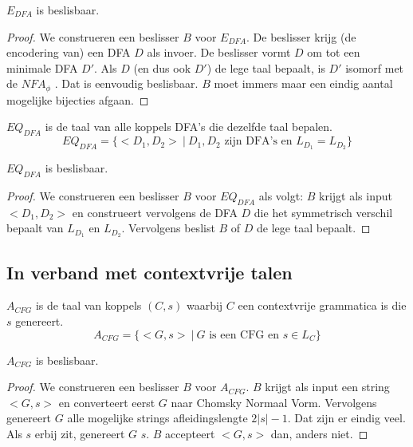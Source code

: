 \documentclass[main.tex]{subfiles}
\begin{document}
\begin{st}
  \label{st:e-dfa-besl}
  $E_{DFA}$ is beslisbaar.

  \begin{proof}
    We construeren een beslisser $B$ voor $E_{DFA}$.
    De beslisser krijg (de encodering van) een DFA $D$ als invoer.
    De beslisser vormt $D$ om tot een minimale DFA $D'$.
    Als $D$ (en dus ook $D'$) de lege taal bepaalt, is $D'$ isomorf met de $NFA_{\phi}$ .
    Dat is eenvoudig beslisbaar. $B$ moet immers maar een eindig aantal mogelijke bijecties afgaan.
  \end{proof}
\end{st}

\begin{de}
  \label{de:eq-dfa}
  $EQ_{DFA}$ is de taal van alle koppels DFA's die dezelfde taal bepalen.
  \[ EQ_{DFA} = \{ <D_{1},D_{2}> \ |\ D_{1},D_{2} \text{ zijn DFA's en } L_{D_{1}} = L_{D_{2}} \} \]  
\end{de}

\begin{st}
  \label{st:eq-dfa-besl}
  $EQ_{DFA}$ is beslisbaar.

  \begin{proof}
    We construeren een beslisser $B$ voor $EQ_{DFA}$ als volgt:
    $B$ krijgt als input $<D_{1},D_{2}>$ en construeert vervolgens de DFA $D$ die het symmetrisch verschil bepaalt van $L_{D_{1}}$ en $L_{D_{2}}$.
    Vervolgens beslist $B$ of $D$ de lege taal bepaalt.
  \end{proof}
\end{st}

\subsection{In verband met contextvrije talen}
\label{sec:verb-met-cont}

\begin{de}
  \label{de:a-cfg}
  $A_{CFG}$ is de taal van koppels $(C,s)$ waarbij $C$ een contextvrije grammatica is die $s$ genereert.
  \[ A_{CFG} = \{ <G,s> \ |\ G \text{ is een CFG en } s \in L_{C} \} \]
\end{de}

\begin{st}
  \label{st:a-cfg-besl}
  $A_{CFG}$ is beslisbaar.

  \begin{proof}
    We construeren een beslisser $B$ voor $A_{CFG}$.
    $B$ krijgt als input een string $<G,s>$ en converteert eerst $G$ naar Chomsky Normaal Vorm.
    Vervolgens genereert $G$ alle mogelijke strings afleidingslengte $2|s| - 1$.
    Dat zijn er eindig veel.
    Als $s$ erbij zit, genereert $G$ $s$.
    $B$ accepteert $<G,s>$ dan, anders niet.
  \end{proof}
\end{st}
\end{document}
